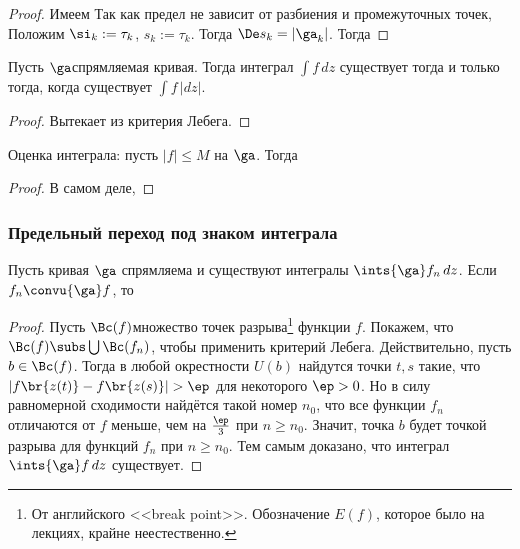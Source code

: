\documentclass[a4paper]{article}
\begin{document}
\begin{solution}
\begin{stm}
\end{stm}
\begin{proof}
Имеем
Так как предел не зависит от разбиения и промежуточных точек, Положим $\si_k := \tau_k$, $s_k := \tau_k$.
Тогда $\De s_k = |\ga_k|$.
Тогда
\hfill\end{proof}

\begin{stm}
Пусть $\ga$\т спрямляемая кривая. Тогда интеграл $\int f\,dz$ существует тогда и только тогда, когда существует
$\int f\,|dz|$.
\end{stm}
\begin{proof}
Вытекает из критерия Лебега.
\end{proof}

\begin{stm}
Оценка интеграла: пусть $|f| \le M$ на $\ga$. Тогда
\end{stm}
\begin{proof}
В самом деле,
\hfill\end{proof}

\subsubsection{Предельный переход под знаком интеграла}

\begin{theorem}
Пусть кривая $\ga$ спрямляема и существуют интегралы $\ints{\ga}f_n\,dz$.
Если $f_n \convu{\ga} f$, то
\end{theorem}
\begin{proof}
Пусть $\Bc(f)$\т множество точек разрыва\footnote{От английского <<break point>>.
Обозначение $E(f)$, которое было на лекциях, крайне неестественно.}
функции $f$. Покажем, что $\Bc(f) \subs \bigcup \Bc(f_n)$, чтобы применить критерий Лебега.
Действительно, пусть $b\in \Bc(f)$.
Тогда в любой окрестности $U(b)$ найдутся точки $t,s$ такие, что $|f\br{z(t)}-f\br{z(s)}|>\ep$ для
некоторого $\ep > 0$. Но в силу равномерной сходимости найдётся такой номер $n_0$, что все функции $f_n$
отличаются от $f$ меньше, чем на $\frac{\ep}{3}$ при $n\ge n_0$. Значит, точка $b$ будет точкой разрыва
для функций $f_n$ при $n\ge n_0$. Тем самым доказано, что интеграл $\ints{\ga}f\,dz$ существует.


\end{proof}
\end{solution}
\end{document}
